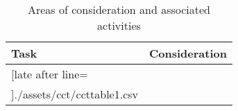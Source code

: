 
\begin{table}
\caption{\label{tab:ccttable1}Areas of consideration and associated activities}
\centering
\begin{tabular}{p{10em}p{25em}}
	\toprule
	Task&Consideration\\
	\midrule
		\csvreader[late after line=\\]{./assets/cct/ccttable1.csv}{}%
		{\csvcoli & \csvcolii }%
	\bottomrule
	\end{tabular}
\end{table}

